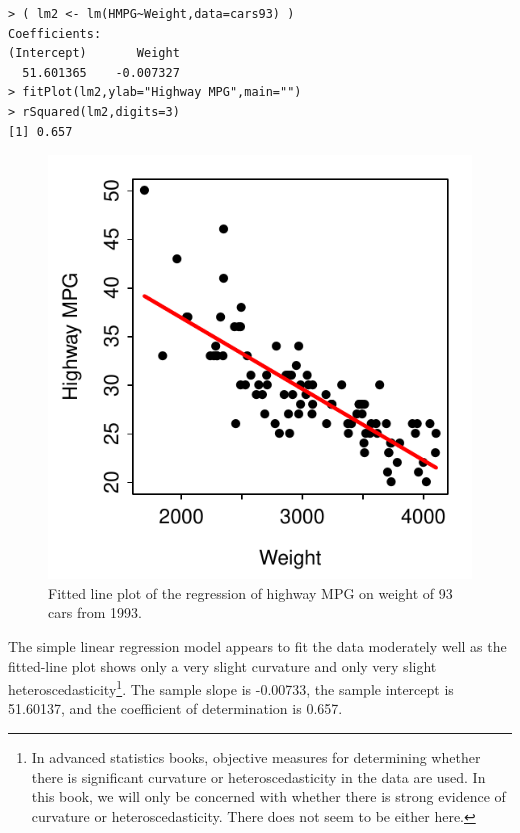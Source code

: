 \documentclass[10pt,openany]{book}\usepackage[]{graphicx}\usepackage[]{color}
\makeatletter
\newenvironment{kframe}{%
 \def\at@end@of@kframe{}%
 \ifinner\ifhmode%
  \def\at@end@of@kframe{\end{minipage}}%
  \begin{minipage}{\columnwidth}%
 \fi\fi%
 \def\FrameCommand##1{\hskip\@totalleftmargin \hskip-\fboxsep
 \colorbox{shadecolor}{##1}\hskip-\fboxsep
     \hskip-\linewidth \hskip-\@totalleftmargin \hskip\columnwidth}%
 \MakeFramed {\advance\hsize-\width
   \@totalleftmargin\z@ \linewidth\hsize
   \@setminipage}}%
 {\par\unskip\endMakeFramed%
 \at@end@of@kframe}
\newenvironment{knitrout}{}{} %
\makeatother
\begin{document}
\begin{knitrout}
\color{fgcolor}\begin{kframe}
\begin{verbatim}
> ( lm2 <- lm(HMPG~Weight,data=cars93) )
Coefficients:
(Intercept)       Weight  
  51.601365    -0.007327  
> fitPlot(lm2,ylab="Highway MPG",main="")
> rSquared(lm2,digits=3)
[1] 0.657
\end{verbatim}
\end{kframe}\begin{figure}[hbtp]

{\centering \includegraphics[width=.4\linewidth]{Figs/CarFit-1} 

}

\caption[Fitted line plot of the regression of highway MPG on weight of 93 cars from 1993]{Fitted line plot of the regression of highway MPG on weight of 93 cars from 1993.}\label{fig:CarFit}
\end{figure}


\end{knitrout}

The simple linear regression model appears to fit the data moderately well as the fitted-line plot  shows only a very slight curvature and only very slight heteroscedasticity\footnote{In advanced statistics books, objective measures for determining whether there is significant curvature or heteroscedasticity in the data are used.  In this book, we will only be concerned with whether there is strong evidence of curvature or heteroscedasticity.  There does not seem to be either here.}.  The sample slope is -0.00733, the sample intercept is 51.60137, and the coefficient of determination is 0.657.
\end{document}
